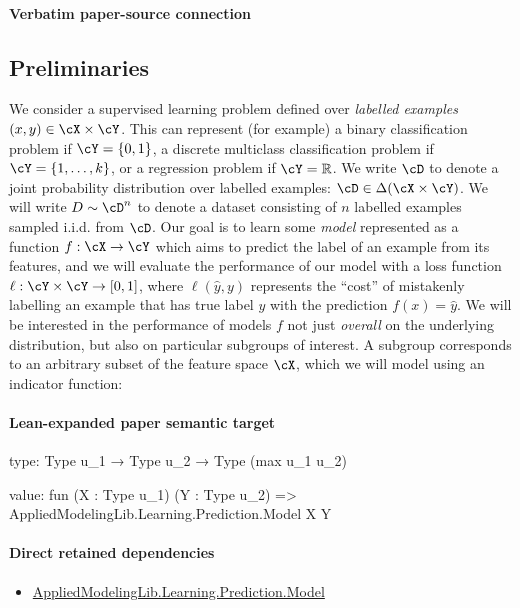 \documentclass[10pt]{article}
\begin{document}
\paragraph{Verbatim paper-source connection}
\begin{ReviewVerbatim}
\section{Preliminaries}
We consider a supervised learning problem defined over \emph{labelled examples} $(x,y) \in \cX \times \cY$. This can represent (for example) a binary classification problem if $\cY = \{0,1\}$, a discrete multiclass classification problem if $\cY = \{1,\ldots,k\}$, or a regression problem if $\cY = \mathbb{R}$. We write $\cD$ to denote a joint probability distribution over labelled examples: $\cD \in \Delta (\cX \times \cY)$. We will write $D \sim \cD^n$ to denote a dataset consisting of $n$ labelled examples sampled i.i.d. from $\cD$. Our goal is to learn some \emph{model} represented as a function $f:\cX\rightarrow \cY$ which aims to predict the label of an example from its features, and we will evaluate the performance of our model with a loss function $\ell:\cY\times \cY \rightarrow [0,1]$, where $\ell(\hat y, y)$ represents the ``cost'' of mistakenly labelling an example that has true label $y$ with the prediction $f(x) = \hat y$. We will be interested in the performance of models $f$ not just \emph{overall} on the underlying distribution, but also on particular subgroups of interest. A subgroup corresponds to an arbitrary subset of the feature space $\cX$, which we will model using an indicator function:
\end{ReviewVerbatim}



\paragraph{Lean-expanded paper semantic target}
\begin{ReviewVerbatim}
type:
Type u_1 → Type u_2 → Type (max u_1 u_2)

value:
fun (X : Type u_1) (Y : Type u_2) => AppliedModelingLib.Learning.Prediction.Model X Y
\end{ReviewVerbatim}

\paragraph{Direct retained dependencies}
\begin{itemize}\raggedright
\item \hyperlink{governing-declaration-28219918dd3306b5}{Applied\allowbreak{}Modeling\allowbreak{}Lib.\allowbreak{}Learning.\allowbreak{}Prediction.\allowbreak{}Model}
\end{itemize}
\end{document}
